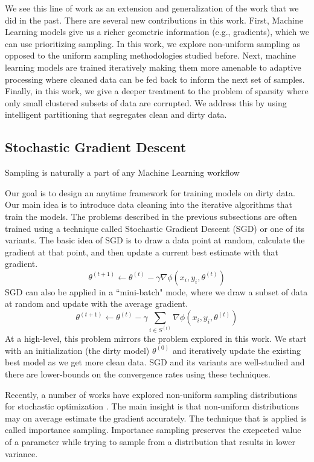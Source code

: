 We see this line of work as an extension and generalization of the work that we did in the past.
There are several new contributions in this work.
First, Machine Learning models give us a richer geometric information (e.g., gradients), which we can use 
prioritizing sampling.
In this work, we explore non-uniform sampling as opposed to the uniform sampling methodologies studied before.
Next, machine learning models are trained iteratively making them more amenable to adaptive processing where cleaned data can be fed back to inform the next set of samples.
Finally, in this work, we give a deeper treatment to the problem of sparsity where only small clustered subsets of data are corrupted.
We address this by using intelligent partitioning that segregates clean and dirty data.

\subsection{Stochastic Gradient Descent}
Sampling is naturally a part of any Machine Learning workflow 

Our goal is to design an anytime framework for training models on dirty data.
Our main idea is to introduce data cleaning into the iterative algorithms that train the models. 
The problems described in the previous subsections are often trained using a technique called Stochastic Gradient Descent (SGD) or one of its variants.
The basic idea of SGD is to draw a data point at random, calculate the gradient at that point, and then update a current best estimate with that gradient.
\[
\theta^{(t+1)}\leftarrow\theta^{(t)}-\gamma\nabla\phi(x_{i},y_{i},\theta^{(t)})
\]
 SGD can also be applied in a ``mini-batch" mode, where we draw a subset of data at random and update with the average gradient.
 \[
 \theta^{(t+1)}\leftarrow\theta^{(t)}-\gamma\sum_{i\in S^{(t)}}\nabla\phi(x_{i},y_{i},\theta^{(t)})
 \]
 At a high-level, this problem mirrors the problem explored in this work. We start with an initialization (the dirty model) $\theta^{(0)}$ and iteratively update the existing best model as we get more clean data. 
SGD and its variants are well-studied and there are lower-bounds on the convergence rates using these techniques. 

Recently, a number of works have explored non-uniform sampling distributions for stochastic optimization \cite{zhao2014stochastic, qu2014randomized}.
The main insight is that non-uniform distributions may on average estimate the gradient accurately.
The technique that is applied is called importance sampling.
Importance sampling preserves the exepected value of a parameter while trying to sample from a distribution that results in lower variance.





 